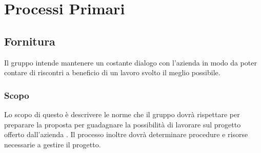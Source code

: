 \justify \section{Processi Primari}

\subsection{Fornitura}
Il gruppo \groupName{} intende mantenere un costante dialogo con l'azienda \proposerName{} in modo da poter contare
di riscontri a beneficio di un lavoro svolto il meglio possibile.

\subsubsection{Scopo}
Lo scopo di questo  è descrivere le norme che il gruppo dovrà rispettare per preparare la proposta per 
guadagnare la possibilità di lavorare sul progetto offerto dall'azienda \proposerName{}.  Il processo inoltre
dovrà determinare procedure e risorse necessarie a gestire il progetto.

